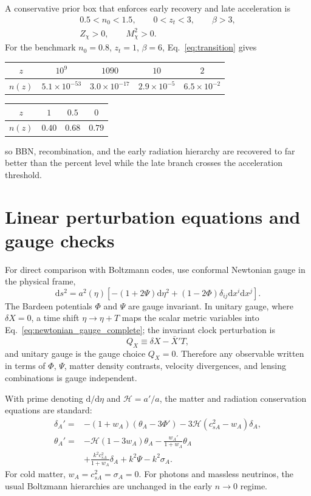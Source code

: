 \documentclass[aps,prd,reprint,nofootinbib,superscriptaddress,longbibliography]{revtex4-2}
\newcommand{\dd}{\mathrm{d}}
\begin{document}
A conservative prior box that enforces early recovery and late acceleration is
\begin{align}
  0.5<n_0<1.5,\qquad 0<z_t<3,
  \qquad \beta>3,\label{eq:transition_priors}\\
  Z_\chi>0,
  \qquad M_\chi^2>0 .\nonumber
\end{align}
For the benchmark $n_0=0.8$, $z_t=1$, $\beta=6$, Eq.~\eqref{eq:transition} gives
\begin{center}
\begin{tabular}{c|cccc}
$z$ & $10^9$ & $1090$ & $10$ & $2$ \\
\hline
$n(z)$ & $5.1\times10^{-53}$ & $3.0\times10^{-17}$ & $2.9\times10^{-5}$ & $6.5\times10^{-2}$
\end{tabular}
\begin{tabular}{c|ccc}
$z$ & $1$ & $0.5$ & $0$ \\
\hline
$n(z)$ & $0.40$ & $0.68$ & $0.79$
\end{tabular}
\end{center}
so BBN, recombination, and the early radiation hierarchy are recovered to far better than the percent level while the late branch crosses the acceleration threshold.

\section{Linear perturbation equations and gauge checks}
\label{sec:linear_perturbations_completion}

For direct comparison with Boltzmann codes, use conformal Newtonian gauge in the physical frame,
\begin{equation}
  \dd s^2=a^2(\eta)\left[-(1+2\Psi)\dd\eta^2+(1-2\Phi)\delta_{ij}\dd x^i\dd x^j\right].
  \label{eq:newtonian_gauge_complete}
\end{equation}
The Bardeen potentials $\Phi$ and $\Psi$ are gauge invariant.  In unitary gauge, where $\delta X=0$, a time shift $\eta\to\eta+T$ maps the scalar metric variables into Eq.~\eqref{eq:newtonian_gauge_complete}; the invariant clock perturbation is
\begin{equation}
  Q_X\equiv \delta X-\bar X'T,
  \label{eq:QX_gauge}
\end{equation}
and unitary gauge is the gauge choice $Q_X=0$.  Therefore any observable written in terms of $\Phi$, $\Psi$, matter density contrasts, velocity divergences, and lensing combinations is gauge independent.

With prime denoting $\dd/\dd\eta$ and $\mathcal H=a'/a$, the matter and radiation conservation equations are standard:
\begin{align}
  \delta_A'={}&-(1+w_A)(\theta_A-3\Phi')
  -3\mathcal H(c_{sA}^2-w_A)\delta_A,\label{eq:fluid_delta}\\
  \theta_A'={}&-\mathcal H(1-3w_A)\theta_A
  -\frac{w_A'}{1+w_A}\theta_A\nonumber\\
  &+\frac{k^2c_{sA}^2}{1+w_A}\delta_A+k^2\Psi-k^2\sigma_A .\label{eq:fluid_theta}
\end{align}
For cold matter, $w_A=c_{sA}^2=\sigma_A=0$.  For photons and massless neutrinos, the usual Boltzmann hierarchies are unchanged in the early $n\to0$ regime.
\end{document}
